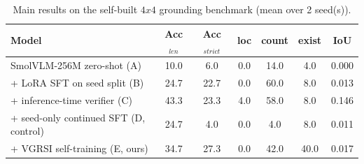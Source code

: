\begin{table}[t]
\centering
\small
\caption{Main results on the self-built $4x4$ grounding benchmark (mean over 2 seed(s)).}
\label{tab:main}
\begin{tabular}{lcccccc}
\toprule
Model & Acc$_{len}$ & Acc$_{strict}$ & loc & count & exist & IoU \\
\midrule
SmolVLM-256M zero-shot (A) & 10.0 & 6.0 & 0.0 & 14.0 & 4.0 & 0.000 \\
+ LoRA SFT on seed split (B) & 24.7 & 22.7 & 0.0 & 60.0 & 8.0 & 0.013 \\
+ inference-time verifier (C) & 43.3 & 23.3 & 4.0 & 58.0 & 8.0 & 0.146 \\
+ seed-only continued SFT (D, control) & 24.7 & 4.0 & 0.0 & 4.0 & 8.0 & 0.011 \\
+ VGRSI self-training (E, ours) & 34.7 & 27.3 & 0.0 & 42.0 & 40.0 & 0.017 \\
\bottomrule
\end{tabular}
\end{table}

